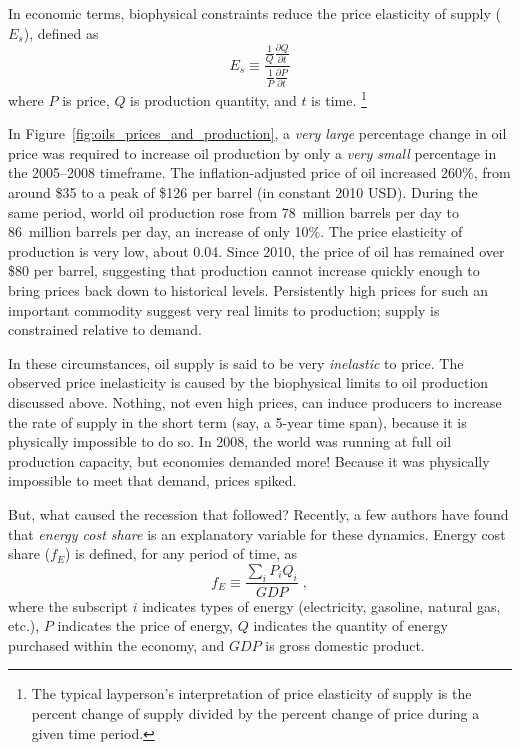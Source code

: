 In economic terms, biophysical constraints reduce the 
price elasticity of supply ($E_s$), defined as 
%
\begin{equation} \label{eq:price_elasticity_of_supply}
	E_s \equiv \frac{\frac{1}{Q}\frac{\partial Q}{\partial t}}{\frac{1}{P}\frac{\partial P}{\partial t}}
\end{equation}
%
where $P$ is price, $Q$ is production quantity, and $t$ is time.%
	\footnote{
	The typical layperson's interpretation of price elasticity of supply is the 
	percent change of supply divided by the percent change of price
	during a given time period.
	}

In Figure~\ref{fig:oils_prices_and_production}, 
a \emph{very large} percentage change in oil price was required to 
increase oil production by only a \emph{very small} percentage
in the 2005--2008 timeframe.
The inflation-adjusted price of oil increased 260\%,
from around \$35 to a peak of \$126 per barrel 
(in constant 2010 USD).
During the same period,
world oil production rose from 
78~million barrels per day to 86~million barrels per day,
an increase of only 10\%.\cite{EIA2014}
The price elasticity of production is very low, about 0.04.
Since 2010, the price of oil has remained over \$80 per barrel,
suggesting that production cannot increase quickly enough to bring prices
back down to historical levels.
Persistently high prices for such an important commodity
suggest very real limits to production; 
supply is constrained relative to demand. 

In these circumstances, 
oil supply is said to be very \emph{inelastic} to price.
The observed price inelasticity is caused by 
the biophysical limits to oil production discussed above.
Nothing, not even high prices, can induce producers to 
increase the rate of supply in the short term (say, a 5-year time span), 
because it is physically impossible to do so.
In 2008, the world was running at full oil production capacity, 
but economies demanded more!
Because it was physically impossible to meet that demand,
prices spiked.

But, what caused the recession that followed?
Recently, a few authors have found that \emph{energy cost share} 
is an explanatory variable for these dynamics.
Energy cost share ($f_E$) is defined, for any period of time, as
%
\begin{equation}
	f_E \equiv \frac{\displaystyle\sum_i P_i Q_i}{GDP} \; ,
\end{equation}
%
where 
the subscript $i$ indicates types of energy 
(electricity, gasoline, natural gas, etc.),
$P$ indicates the price of energy,
$Q$ indicates the quantity of energy purchased within the economy, and
$GDP$ is gross domestic product.

